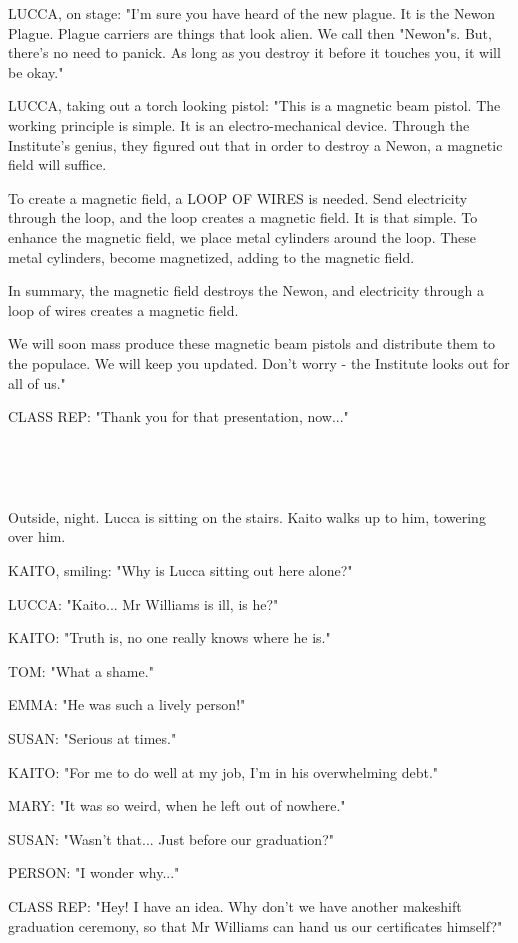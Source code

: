 \documentclass[11pt]{article}
\begin{document}
LUCCA, on stage: "I'm sure you have heard of the new plague. 
It is the Newon Plague.
Plague carriers are things that look alien. 
We call then "Newon"s.
But, there's no need to panick.
As long as you destroy it before it touches you, it will be okay."

LUCCA, taking out a torch looking pistol: "This is a magnetic beam pistol.
The working principle is simple.
It is an electro-mechanical device.
Through the Institute's genius, they figured out that in order to destroy a Newon, a magnetic field will suffice.

To create a magnetic field, a LOOP OF WIRES is needed. 
Send electricity through the loop, and the loop creates a magnetic field.
It is that simple.
To enhance the magnetic field, we place metal cylinders around the loop.
These metal cylinders, become magnetized, adding to the magnetic field.

In summary, the magnetic field destroys the Newon, and electricity through a loop of wires creates a magnetic field.

We will soon mass produce these magnetic beam pistols and distribute them to the populace. 
We will keep you updated. 
Don't worry - the Institute looks out for all of us."

CLASS REP: "Thank you for that presentation, now..."

\ 

\ 

Outside, night.
Lucca is sitting on the stairs.
Kaito walks up to him, towering over him.

KAITO, smiling: "Why is Lucca sitting out here alone?"

LUCCA: "Kaito...
Mr Williams is ill, is he?"

KAITO: "Truth is, no one really knows where he is."

TOM: "What a shame."

EMMA: "He was such a lively person!"

SUSAN: "Serious at times."

KAITO: "For me to do well at my job, I'm in his overwhelming debt."

MARY: "It was so weird, when he left out of nowhere."

SUSAN: "Wasn't that... Just before our graduation?"

PERSON: "I wonder why..."

CLASS REP: "Hey! I have an idea. 
Why don't we have another makeshift graduation ceremony, so that Mr Williams can hand us our certificates himself?"
\end{document}
